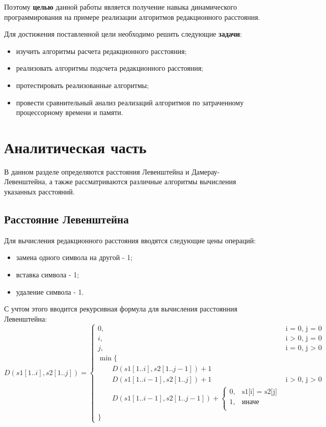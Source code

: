 \documentclass{report}
\begin{document}
Поэтому \textbf{целью} данной работы является получение навыка динамического программирования на примере реализации алгоритмов редакционного расстояния. 

Для достижения поставленной цели необходимо решить следующие \textbf{задачи}:
\begin{itemize}
\item изучить алгоритмы расчета редакционного расстояния;
\item реализовать алгоритмы подсчета редакционного расстояния;
\item протестировать реализованные алгоритмы;
\item провести сравнительный анализ реализаций алгоритмов по затраченному процессорному времени и памяти.
\end{itemize}


\chapter{Аналитическая часть}
В данном разделе определяются расстояния Левенштейна и Дамерау-Левенштейна, а также рассматриваются различные алгоритмы вычисления указанных расстояний.

\section{Расстояние Левенштейна}

Для вычисления редакционного расстояния вводятся следующие цены операций:
\begin{itemize}
\item замена одного символа на другой - 1;
\item вставка символа - 1;
\item удаление символа - 1.
\end{itemize}

С учтом этого вводится рекурсивная формула для вычисления расстоянния Левенштейна:
\begin{equation}
\label{eq:LD}
D(s1[1..i], s2[1..j]) = 
\begin{cases}
0,  &\text{i = 0, j = 0}\\
i,  &\text{i > 0, j = 0}\\
j,  &\text{i = 0, j >  0}\\
\min \lbrace \\
\qquad D(s1[1..i], s2[1..j-1]) + 1\\
\qquad D(s1[1..i-1], s2[1..j]) + 1 &\text{i > 0, j > 0}\\
\qquad D(s1[1..i-1], s2[1..j-1]) + 
\begin{cases} 
0, &\text{s1[i] = s2[j]}\\
1, &\text{иначе}\\ 
\end{cases}\\
\rbrace
\end{cases}
\end{equation}
\end{document}
